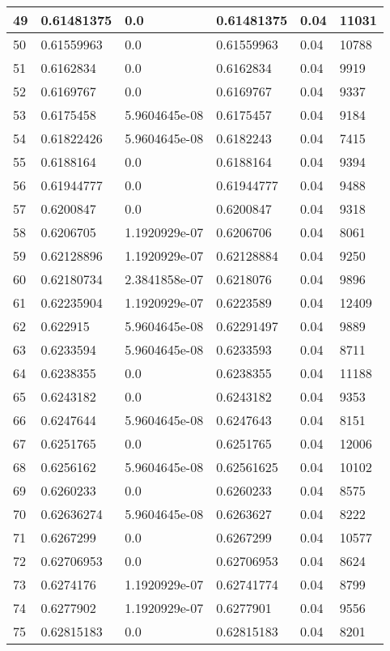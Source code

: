 \begin{longtable}{|l|l|l|l|l|l|}
49 & 0.61481375 & 0.0 & 0.61481375 & 0.04 & 11031 \\ \hline 
50 & 0.61559963 & 0.0 & 0.61559963 & 0.04 & 10788 \\ \hline 
51 & 0.6162834 & 0.0 & 0.6162834 & 0.04 & 9919 \\ \hline 
52 & 0.6169767 & 0.0 & 0.6169767 & 0.04 & 9337 \\ \hline 
53 & 0.6175458 & 5.9604645e-08 & 0.6175457 & 0.04 & 9184 \\ \hline 
54 & 0.61822426 & 5.9604645e-08 & 0.6182243 & 0.04 & 7415 \\ \hline 
55 & 0.6188164 & 0.0 & 0.6188164 & 0.04 & 9394 \\ \hline 
56 & 0.61944777 & 0.0 & 0.61944777 & 0.04 & 9488 \\ \hline 
57 & 0.6200847 & 0.0 & 0.6200847 & 0.04 & 9318 \\ \hline 
58 & 0.6206705 & 1.1920929e-07 & 0.6206706 & 0.04 & 8061 \\ \hline 
59 & 0.62128896 & 1.1920929e-07 & 0.62128884 & 0.04 & 9250 \\ \hline 
60 & 0.62180734 & 2.3841858e-07 & 0.6218076 & 0.04 & 9896 \\ \hline 
61 & 0.62235904 & 1.1920929e-07 & 0.6223589 & 0.04 & 12409 \\ \hline 
62 & 0.622915 & 5.9604645e-08 & 0.62291497 & 0.04 & 9889 \\ \hline 
63 & 0.6233594 & 5.9604645e-08 & 0.6233593 & 0.04 & 8711 \\ \hline 
64 & 0.6238355 & 0.0 & 0.6238355 & 0.04 & 11188 \\ \hline 
65 & 0.6243182 & 0.0 & 0.6243182 & 0.04 & 9353 \\ \hline 
66 & 0.6247644 & 5.9604645e-08 & 0.6247643 & 0.04 & 8151 \\ \hline 
67 & 0.6251765 & 0.0 & 0.6251765 & 0.04 & 12006 \\ \hline 
68 & 0.6256162 & 5.9604645e-08 & 0.62561625 & 0.04 & 10102 \\ \hline 
69 & 0.6260233 & 0.0 & 0.6260233 & 0.04 & 8575 \\ \hline 
70 & 0.62636274 & 5.9604645e-08 & 0.6263627 & 0.04 & 8222 \\ \hline 
71 & 0.6267299 & 0.0 & 0.6267299 & 0.04 & 10577 \\ \hline 
72 & 0.62706953 & 0.0 & 0.62706953 & 0.04 & 8624 \\ \hline 
73 & 0.6274176 & 1.1920929e-07 & 0.62741774 & 0.04 & 8799 \\ \hline 
74 & 0.6277902 & 1.1920929e-07 & 0.6277901 & 0.04 & 9556 \\ \hline 
75 & 0.62815183 & 0.0 & 0.62815183 & 0.04 & 8201 \\ \hline 
\end{longtable}